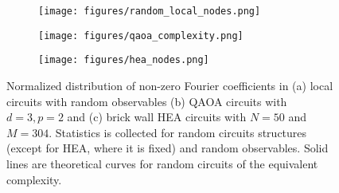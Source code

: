 \documentclass[twocolumn, amsfonts, amssymb, aps, nofootinbib]{revtex4-2}
\begin{document}
\begin{figure}
	\begin{subfigure}{0.32\textwidth}
		\texttt{[image: figures/random\_local\_nodes.png]}
		\caption{}
		\label{fig random local nodes}
	\end{subfigure}
	\begin{subfigure}{0.32\textwidth}
		\texttt{[image: figures/qaoa\_complexity.png]}
		\caption{}
		\label{fig qaoa nodes}
	\end{subfigure}
	\begin{subfigure}{0.32\textwidth}
		\texttt{[image: figures/hea\_nodes.png]}
		\caption{}
		\label{fig hea nodes}
	\end{subfigure}
\caption{Normalized distribution of non-zero Fourier coefficients in (a) local circuits with random observables (b) QAOA circuits with $d=3, p=2$ and (c) brick wall HEA circuits with $N=50$ and $M=304$. Statistics is collected for random circuits structures (except for HEA, where it is fixed) and random observables. Solid lines are theoretical curves for random circuits of the equivalent complexity.	}
\end{figure}
\end{document}
